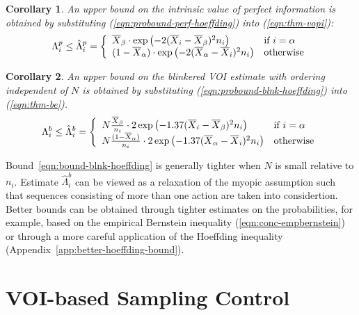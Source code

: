 \documentclass{article}
\newtheorem{crl}{Corollary}
\begin{document}
\begin{crl} An upper bound on the intrinsic value of perfect information is obtained by substituting
(\ref{eqn:probound-perf-hoeffding}) into (\ref{eqn:thm-vopi}):
\begin{equation}
  \Lambda_i^p \le \hat\Lambda_i^p=\left\{
  \begin{array}{l l}
    \overline X_\beta\cdot \exp\left(- 2(\overline X_i - \overline X_\beta)^2 n_i \right) & \mbox{{\rm if} $i=\alpha$} \\
    (1-\overline  X_\alpha)\cdot \exp\left(- 2(\overline X_\alpha - \overline X_i)^2 n_i \right)  &  \mbox{\rm otherwise}
  \end{array} \right.
\label{eqn:bound-perf-hoeffding}
\end{equation}
\label{crl:bound-perf-hoeffding}
\end{crl}
\begin{crl}
An upper bound on the blinkered VOI estimate with ordering independent of $N$ is obtained
by substituting (\ref{eqn:probound-blnk-hoeffding}) into (\ref{eqn:thm-be}).
\begin{equation}
  \Lambda_i^b \le \hat\Lambda_i^b=\left\{
  \begin{array}{l l}
    N\frac {\overline X_\beta} {n_i}\cdot 2\exp\left(- 1.37(\overline X_i - \overline X_\beta)^2 n_i\right)
      & \mbox{{\rm if} $i=\alpha$} \\
    N\frac {(1-\overline  X_\alpha)} {n_i}\cdot 2\exp\left(- 1.37(\overline X_\alpha - \overline X_i)^2 n_i\right)
      &  \mbox{\rm otherwise}
  \end{array} \right.
\label{eqn:bound-blnk-hoeffding}
\end{equation}
\label{crl:bound-blnk-hoeffding}
\end{crl}
Bound~\ref{eqn:bound-blnk-hoeffding} is generally tighter when $N$ is
small relative to $n_i$. Estimate $\hat\Lambda_i^b$ can be viewed as a
relaxation of the myopic assumption such that sequences consisting
of more than one action are taken into considertion. Better bounds can
be obtained through tighter estimates on the probabilities, for
example, based on the empirical Bernstein inequality
(\ref{eqn:conc-empbernstein}) or through a more careful application of
the Hoeffding inequality (Appendix~\ref{app:better-hoeffding-bound}).

\section{VOI-based Sampling Control}
\end{document}
